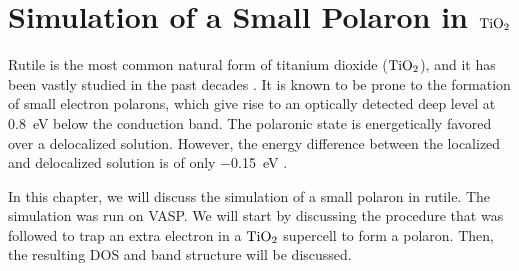 \chapter{Simulation of a Small Polaron in $\ce{TiO_2}$} \label{ch:simulation}
Rutile is the most common natural form of titanium dioxide ($\ce{TiO_2}$), and it has been vastly studied in the past decades \cite{franchini2021b}. It is known to be prone to the formation of small electron polarons, which give rise to an optically detected deep level at \SI{0.8}{eV} below the conduction band. The polaronic state is energetically favored over a delocalized solution. However, the  energy difference between the localized and delocalized solution is of only \SI{-0.15}{eV} \cite{janotti2013}.

In this chapter, we will discuss the simulation of a small polaron in rutile. The simulation was run on VASP. We will start by discussing the procedure that was followed to trap an extra electron in a $\ce{TiO_2}$ supercell to form a polaron. Then, the resulting DOS and band structure will be discussed.



